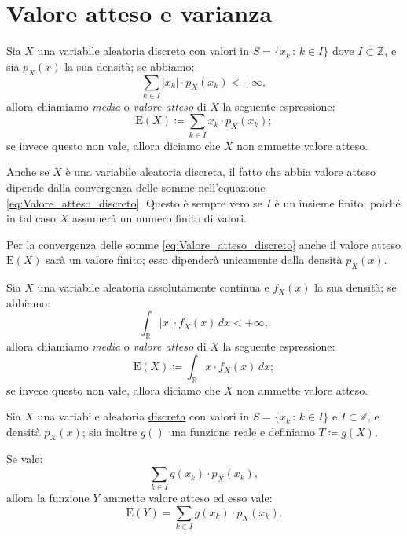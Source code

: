     \section{Valore atteso e varianza}
    \begin{defn}[discreto]\label{defn:Valore_atteso_discreto}
            Sia $X$ una variabile aleatoria discreta con valori in $S = \{x_k \,:\, k \in I\}$ dove $I \subset \mathbb{Z}$, e sia $p_X(x)$ la sua densità; se abbiamo: \[
                \sum_{k \in I} \left|x_k\right| \cdot p_X(x_k) < +\infty
            ,\] allora chiamiamo \textit{media} o \textit{valore atteso} di $X$ la seguente espressione:
            \begin{equation}\label{eq:Valore_atteso_discreto}
                \text{E}(X) \coloneqq \sum_{k \in I}x_k \cdot p_X(x_k)
            ;\end{equation}
            se invece questo non vale, allora diciamo che $X$ non ammette valore atteso.
        \end{defn}
        \begin{obsv}
            Anche se $X$ è una variabile aleatoria discreta, il fatto che abbia valore atteso dipende dalla convergenza delle somme nell'equazione \eqref{eq:Valore_atteso_discreto}. Questo è sempre vero se $I$ è un insieme finito, poiché in tal caso $X$ assumerà un numero finito di valori.

            Per la convergenza delle somme \eqref{eq:Valore_atteso_discreto} anche il valore atteso $\text{E}(X)$ sarà un valore finito; esso dipenderà unicamente dalla densità $p_X(x)$.
        \end{obsv}
        \begin{defn}[continuo]\label{defn:Valore_atteso_continuo}
            Sia $X$ una variabile aleatoria assolutamente continua e $f_X(x)$ la sua densità; se abbiamo: \[
                \int_{\mathbb{R}} |x| \cdot f_X(x)\, dx < +\infty 
            ,\] allora chiamiamo \textit{media} o \textit{valore atteso}  di $X$ la seguente espressione:
            \begin{equation}\label{eq:Valore_atteso_continuo}
                \text{E}(X) \coloneqq \int_{\mathbb{R}} x \cdot f_X(x)\, dx
            ;\end{equation}
            se invece questo non vale, allora diciamo che $X$ non ammette valore atteso.
        \end{defn}
        \begin{defn}[discreta]
            Sia $X$ una variabile aleatoria \underline{discreta} con valori in $S = \{x_k \,:\, k \in I\}$ e $I \subset \mathbb{Z}$, e densità $p_X(x)$; sia inoltre $g()$ una funzione reale  e definiamo $T \coloneqq  g(X)$.

            Se vale: \[
                \sum_{k \in I} g(x_k)  \cdot p_X(x_k)
            ,\] allora la funzione $Y$ ammette valore atteso ed esso vale:
            \begin{equation}\label{eq:Valore_atteso_funzione_discreta}
                \text{E}(Y) = \sum_{k \in I} g(x_k) \cdot p_X(x_k)
            .\end{equation}
        \end{defn}
